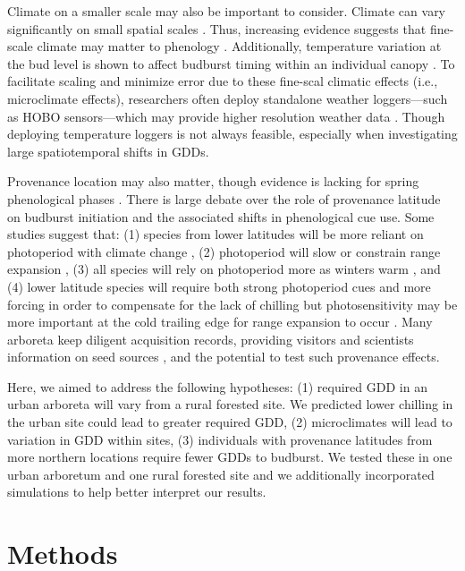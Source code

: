 \documentclass{article}\usepackage[]{graphicx}\usepackage[]{color}
\begin{document}
Climate on a smaller scale may also be important to consider. Climate can vary significantly on small spatial scales \citep[][e.g., as much as 2.6$^{\circ}$C between sensors at the same vineyard or up to 6.6$^{\circ}$C within 1 km spatial units in northern Europe]{deResseguier2020,Lenoir2013}. Thus, increasing evidence suggests that fine-scale climate may matter to phenology \citep{Lembrechts2019}. Additionally, temperature variation at the bud level is shown to affect budburst timing within an individual canopy \citep{Lembrechts2019}. To facilitate scaling and minimize error due to these fine-scal climatic effects (i.e., microclimate effects), researchers often deploy standalone weather loggers---such as HOBO sensors---which may provide higher resolution weather data \citep{Schwartz2013a,Whiteman2000}. Though deploying temperature loggers is not always feasible, especially when investigating large spatiotemporal shifts in GDDs. 
  
Provenance location may also matter, though evidence is lacking for spring phenological phases \citep{Aitken2015, McKown2013}. There is large debate over the role of provenance latitude on budburst initiation and the associated shifts in phenological cue use. Some studies suggest that: (1) species from lower latitudes will be more reliant on photoperiod with climate change \citep{Zohner2016}, (2) photoperiod will slow or constrain range expansion \citep{Saikkonen2012}, (3) all species will rely on photoperiod more as winters warm \citep{Way2015}, and (4) lower latitude species will require both strong photoperiod cues and more forcing in order to compensate for the lack of chilling but photosensitivity may be more important at the cold trailing edge for range expansion to occur \citep{Gauzere2017}. Many arboreta keep diligent acquisition records, providing visitors and scientists information on seed sources \citep{Dosmann2006}, and the potential to test such provenance effects.

Here, we aimed to address the following hypotheses: (1) required GDD in an urban arboreta will vary from a rural forested site. We predicted lower chilling in the urban site could lead to greater required GDD, (2) microclimates will lead to variation in GDD within sites, (3) individuals with provenance latitudes from more northern locations require fewer GDDs to budburst. We tested these in one urban arboretum and one rural forested site and we additionally incorporated simulations to help better interpret our results. 

\section*{Methods}
\end{document}
